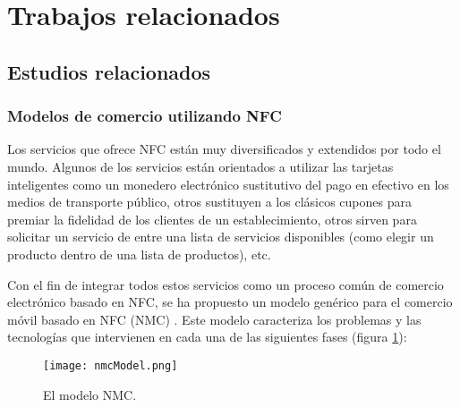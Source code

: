 \section{Trabajos relacionados}
  \subsection{Estudios relacionados}
    \subsubsection{Modelos de comercio utilizando NFC}
  Los servicios que ofrece \acs{NFC} están muy diversificados y extendidos
  por todo el mundo. Algunos de los servicios están orientados a utilizar
  las tarjetas inteligentes como un monedero electrónico sustitutivo del
  pago en efectivo en los medios de transporte público, otros sustituyen
  a los clásicos cupones para premiar la fidelidad de los clientes de un
  establecimiento, otros sirven para solicitar un servicio de entre una
  lista de servicios disponibles (como elegir un producto dentro de una
  lista de productos), etc.

  Con el fin de integrar todos estos servicios como un proceso común de
  comercio electrónico basado en NFC, se ha propuesto un modelo genérico
  para el comercio móvil basado en \acs{NFC} (\acs{NMC})
  \cite{bib:nfcCommerce}. Este modelo caracteriza los problemas y las
  tecnologías que intervienen en cada una de las siguientes fases
  (figura \ref{fig:nmcModel}):

  \begin{figure}[!h]
    \begin{center}
      \texttt{[image: nmcModel.png]}
      \caption{El modelo \acs{NMC}.}
      \label{fig:nmcModel}
    \end{center}
  \end{figure}

